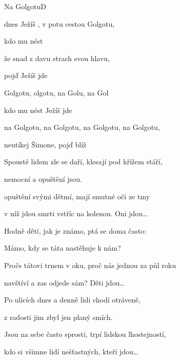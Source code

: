 \setcounter{page}{108}
\begin{song}{Na Golgotu}{D}{}

\begin{SBVerse}

dnes Ježíš , v potu  cestou  Golgotu,

 kdo mu  nést 

 že snad  z davu  strach svou hlavu,

  pojď  Ježíš jde

\end{SBVerse}

\begin{SBChorus}

 Golgotu, olgotu, na Golu, na Gol

 kdo mu  nést  Ježíš jde

na Golgotu, na Golgotu, na Golgotu, na Golgotu,

neutíkej Šimone, pojď blíž 

\end{SBChorus}

\begin{SBVerse}

Spoustě lidem zle se daří, klesají pod křížem stáří,

nemocní a opuštění jsou.

opuštění svými dětmí, mají smutné oči ze tmy

v níž jdou smrti vstříc na kolenou. Oni jdou\dots

\end{SBVerse}

\begin{SBVerse}

Hodně dětí, jak je známo, ptá se doma často:

Mámo, kdy se táta nastěhuje k nám?

Pročs tátovi trnem v oku, proč nás jednou za půl roku

navštíví a zas odjede sám? Děti jdou\dots

\end{SBVerse}

\begin{SBVerse}

Po ulicích dnes a denně lidi chodí otráveně,

z radosti jim zbyl jen planý smích.

Jsou na sebe často sprostí, trpí lidskou lhostejností,

kdo si všimne lidí nešťastných, kteří jdou\dots

\end{SBVerse}

\end{song}

\pagebreak

